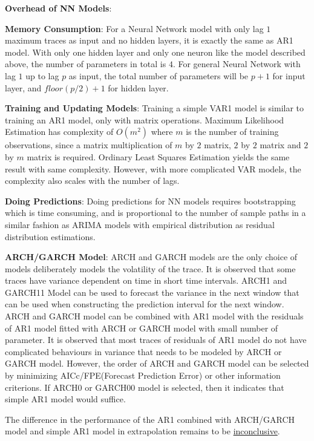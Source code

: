 \documentclass{article}
\begin{document}
\textbf{Overhead of NN Models}:
\begin{flushleft}
\textbf{Memory Consumption}: For a Neural Network model with only lag $1$ maximum traces as input and no hidden layers, it is exactly the same as AR1 model. With only one hidden layer and only one neuron like the model described above, the number of parameters in total is $4$. For general Neural Network with lag $1$ up to lag $p$ as input, the total number of parameters will be $p + 1$ for input layer, and $floor(p / 2) + 1$ for hidden layer.

\textbf{Training and Updating Models}: Training a simple VAR1 model is similar to training an AR1 model, only with matrix operations. Maximum Likelihood Estimation has complexity of $O(m^2)$ where $m$ is the number of training observations, since a matrix multiplication of $m$ by $2$ matrix, $2$ by $2$ matrix and $2$ by $m$ matrix is required. Ordinary Least Squares Estimation yields the same result with same complexity.
However, with more complicated VAR models, the complexity also scales with the number of lags. 

\textbf{Doing Predictions}: Doing predictions for NN models requires bootstrapping which is time consuming, and is proportional to the number of sample paths in a similar fashion as ARIMA models with empirical distribution as residual distribution estimations.  
\end{flushleft}

\begin{flushleft}
\textbf{ARCH/GARCH Model}: ARCH and GARCH models are the only choice of models deliberately models the volatility of the trace. It is observed that some traces have variance dependent on time in short time intervals. ARCH1 and GARCH11 Model can be used to forecast the variance in the next window that can be used when constructing the prediction interval for the next window. ARCH and GARCH model can be combined with AR1 model with the residuals of AR1 model fitted with ARCH or GARCH model with small number of parameter. It is observed that most traces of residuals of AR1 model do not have complicated behaviours in variance that needs to be modeled by ARCH or GARCH model. However, the order of ARCH and GARCH model can be selected by minimizing AICc/FPE(Forecast Prediction Error) or other information criterions. If ARCH0 or GARCH00 model is selected, then it indicates that simple AR1 model would suffice. 

The difference in the performance of the AR1 combined with ARCH/GARCH model and simple AR1 model in extrapolation remains to be \underline{inconclusive}.
\end{flushleft}
\end{document}

